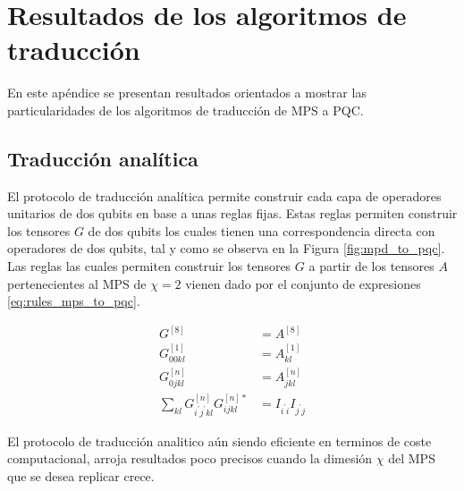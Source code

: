 \newpage

\section{Resultados de los algoritmos de traducción}
\label{apendix:mps_to_pqc}

En este apéndice se presentan resultados orientados a mostrar las particularidades de los algoritmos de traducción de MPS a PQC.

\subsection{Traducción analítica}

El protocolo de traducción analítica permite construir cada capa de operadores unitarios de dos qubits en base a unas reglas fijas. Estas reglas permiten construir los tensores $G$ de dos qubits los cuales tienen una correspondencia directa con operadores de dos qubits, tal y como se observa en la Figura \ref{fig:mpd_to_pqc}. Las reglas las cuales permiten construir los tensores $G$ a partir de los tensores $A$ pertenecientes al MPS de $\chi =2$ vienen dado por el conjunto de expresiones \ref{eq:rules_mps_to_pqc}.

\begin{equation}
\begin{aligned}
G^{[8]} &= A^{[8]} \\
G_{00kl}^{[1]} &= A_{kl}^{[1]} \\
G_{0jkl}^{[n]} &= A_{jkl}^{[n]} \\
\sum_{kl} G^{[n]}_{i^{'} j^{'} k l} G^{[n]*}_{i j k l} &= I_{i^{'} i} I_{j^{'} j}
\end{aligned}
\label{eq:rules_mps_to_pqc}
\end{equation}

El protocolo de traducción analitico aún siendo eficiente en terminos de coste computacional, arroja resultados poco precisos cuando la dimesión $\chi$ del MPS que se desea replicar crece.


